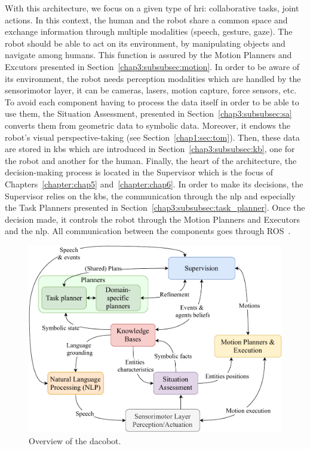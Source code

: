\documentclass[a4paper,11pt,twoside]{StyleThese}
\begin{document}
With this architecture, we focus on a given type of \acrlong{hri}: collaborative tasks, joint actions. In this context, the human and the robot share a common space and exchange information through multiple modalities (speech, gesture, gaze). The robot should be able to act on its environment, by manipulating objects and navigate among humans. This function is assured by the Motion Planners and Excutors presented in Section~\ref{chap3:subsubsec:motion}. In order to be aware of its environment, the robot needs perception modalities which are handled by the sensorimotor layer, it can be cameras, lasers, motion capture, force sensors, etc. To avoid each component having to process the data itself in order to be able to use them, the Situation Assessment, presented in Section~\ref{chap3:subsubsec:sa} converts them from geometric data to symbolic data. Moreover, it endows the robot's visual perspective-taking (see Section~\ref{chap1:sec:tom}). Then, these data are stored in \acrlong{kb}s which are introduced in Section~\ref{chap3:subsubsec:kb}, one for the robot and another for the human. Finally, the heart of the architecture, the decision-making process is located in the Supervisor which is the focus of Chapters~\ref{chapter:chap5} and~\ref{chapter:chap6}. In order to make its decisions, the Supervisor relies on the \acrshort{kb}s, the communication through the \acrfull{nlp} and especially the Task Planners presented in Section~\ref{chap3:subsubsec:task_planner}. Once the decision made, it controls the robot through the Motion Planners and Executors and the \acrshort{nlp}. All communication between the components goes through ROS~\cite{quigley_2009_ros}.

\begin{figure}[!ht]
	\includegraphics[width=\linewidth]{figures/chapter2/archi_overview.pdf}
	\caption{Overview of the \acrfull{dacobot}.}
	\label{chap3:fig:archi}
\end{figure}
\end{document}

